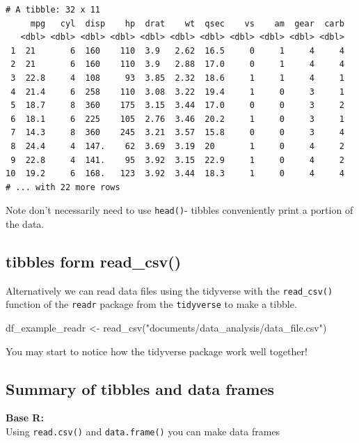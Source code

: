 \documentclass[
]{article}
\newenvironment{Shaded}{\begin{snugshade}}{\end{snugshade}}
\newcommand{\FunctionTok}[1]{\textcolor[rgb]{0.00,0.00,0.00}{#1}}
\newcommand{\NormalTok}[1]{#1}
\newcommand{\OtherTok}[1]{\textcolor[rgb]{0.56,0.35,0.01}{#1}}
\newcommand{\StringTok}[1]{\textcolor[rgb]{0.31,0.60,0.02}{#1}}
\begin{document}
\begin{verbatim}
# A tibble: 32 x 11
     mpg   cyl  disp    hp  drat    wt  qsec    vs    am  gear  carb
   <dbl> <dbl> <dbl> <dbl> <dbl> <dbl> <dbl> <dbl> <dbl> <dbl> <dbl>
 1  21       6  160    110  3.9   2.62  16.5     0     1     4     4
 2  21       6  160    110  3.9   2.88  17.0     0     1     4     4
 3  22.8     4  108     93  3.85  2.32  18.6     1     1     4     1
 4  21.4     6  258    110  3.08  3.22  19.4     1     0     3     1
 5  18.7     8  360    175  3.15  3.44  17.0     0     0     3     2
 6  18.1     6  225    105  2.76  3.46  20.2     1     0     3     1
 7  14.3     8  360    245  3.21  3.57  15.8     0     0     3     4
 8  24.4     4  147.    62  3.69  3.19  20       1     0     4     2
 9  22.8     4  141.    95  3.92  3.15  22.9     1     0     4     2
10  19.2     6  168.   123  3.92  3.44  18.3     1     0     4     4
# ... with 22 more rows
\end{verbatim}

Note don't necessarily need to use \texttt{head()}- tibbles conveniently
print a portion of the data.

\hypertarget{tibbles-form-read_csv}{%
\subsection{tibbles form read\_csv()}\label{tibbles-form-read_csv}}

Alternatively we can read data files using the tidyverse with the
\texttt{read\_csv()} function of the \texttt{readr} package from the
\texttt{tidyverse} to make a tibble.

\begin{Shaded}
\begin{Highlighting}[]
\NormalTok{df\_example\_readr }\OtherTok{\textless{}{-}} \FunctionTok{read\_csv}\NormalTok{(}\StringTok{"documents/data\_analysis/data\_file.csv"}\NormalTok{)}
\end{Highlighting}
\end{Shaded}

You may start to notice how the tidyverse package work well together!

\hypertarget{summary-of-tibbles-and-data-frames}{%
\subsection{Summary of tibbles and data
frames}\label{summary-of-tibbles-and-data-frames}}

\textbf{Base R:}\\
Using \texttt{read.csv()} and \texttt{data.frame()} you can make data
frames
\end{document}
